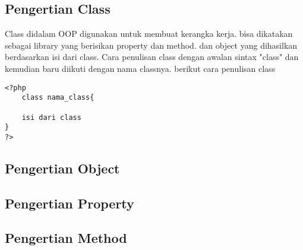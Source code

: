 \subsection{Pengertian Class}
Class didalam OOP digunakan untuk membuat kerangka kerja. bisa dikatakan sebagai library yang berisikan property dan method. dan object yang dihasilkan berdasarkan isi dari class. Cara penulisan class dengan awalan sintax "class" dan kemudian baru diikuti dengan nama classnya. berikut cara penulisan class
 \begin{lstlisting}
<?php
    class nama_class{
	
	isi dari class
}
?>
\end{lstlisting}
\subsection{Pengertian Object}
\subsection{Pengertian Property}
\subsection{Pengertian Method}